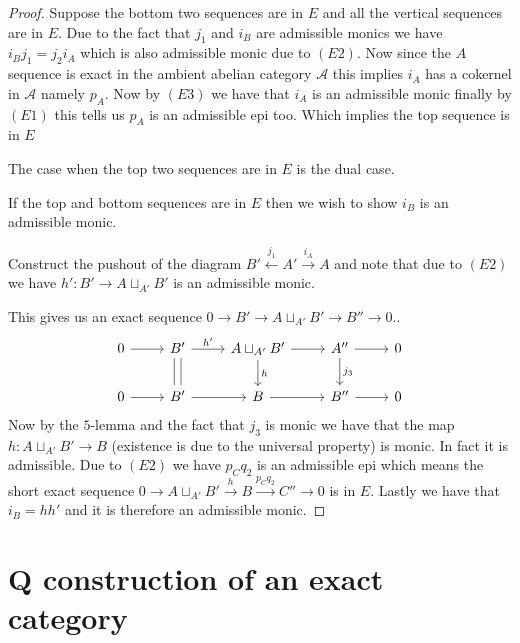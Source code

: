 \documentclass[12pt]{report}
\numberwithin{equation}{section}
\begin{document}
		\begin{proof}
			Suppose the bottom two sequences are in \( E \) and all the vertical sequences are in \( E \). Due to the fact that \( j_1 \) and \( i_B \) are admissible monics we have \( i_B j_1 =j_2 i_A \) which is also admissible monic due to \( (E2) \). Now since the \( A \) sequence is exact in the ambient abelian category \( \mathcal{A} \) this implies \( i_A \) has a cokernel in \( \mathcal{A} \) namely \( p_A \). Now by \( (E3) \) we have that \( i_A \) is an admissible monic finally by \( (E1) \) this tells us \( p_A \) is an admissible epi too. Which implies the top sequence is in \( E \)
		
			The case when the top two sequences are in \( E \) is the dual case.
			
			If the top and bottom sequences are in \( E \) then we wish to show \( i_B \) is an admissible monic.
			
			Construct the pushout of the diagram \( B' \xleftarrow{j_1} A' \xrightarrow{i_A} A \) and note that due to \( (E2) \) we have \( h': B' \to A \sqcup_{A'} B'  \) is an admissible monic.
			
			This gives us an exact sequence \( 0\to B' \to A\sqcup_{A'}B' \to B'' \to 0. \). 
			\[\begin{tikzcd}
				0 & {B'} & {A\sqcup_{A'}B'} & {A''} & 0 \\
				0 & {B'} & B & {B''} & 0
				\arrow[from=1-1, to=1-2]
				\arrow["h'", from=1-2, to=1-3]
				\arrow[shift left, no head, from=1-2, to=2-2]
				\arrow[shift right, no head, from=1-2, to=2-2]
				\arrow[from=1-3, to=1-4]
				\arrow["h", from=1-3, to=2-3]
				\arrow[from=1-4, to=1-5]
				\arrow["{j_3}", from=1-4, to=2-4]
				\arrow[from=2-1, to=2-2]
				\arrow[from=2-2, to=2-3]
				\arrow[from=2-3, to=2-4]
				\arrow[from=2-4, to=2-5]
			\end{tikzcd}\]
			Now by the \( 5 \)-lemma and the fact that \( j_3 \) is monic we have that the map \( h: A \sqcup_{A'}B' \to B \) (existence is due to the universal property) is monic. In fact it is admissible. Due to \( (E2) \) we have \( p_Cq_2 \) is an admissible epi which means the short exact sequence \( 0 \rightarrow A \sqcup_{A'}B' \xrightarrow{h} B \xrightarrow{p_C q_2} C'' \to 0 \) is in \( E \). Lastly we have that \( i_B = h h' \) and it is therefore an admissible monic.
			
		\end{proof}
		
		
		
		\section{Q construction of an exact category}
		
\end{document}
